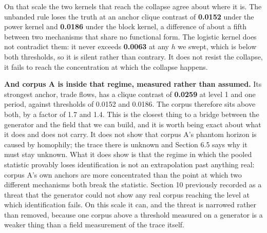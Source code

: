 \documentclass[twoside,11pt]{article}
\begin{document}
On that scale the two kernels that reach the collapse agree about where it is. The unbanded rule loses the truth at an anchor clique contrast of \textbf{0.0152} under the power kernel and \textbf{0.0186} under the block kernel, a difference of about a fifth between two mechanisms that share no functional form. The logistic kernel does not contradict them: it never exceeds \textbf{0.0063} at any \(h\) we swept, which is below both thresholds, so it is silent rather than contrary. It does not resist the collapse, it fails to reach the concentration at which the collapse happens.

\textbf{And corpus A is inside that regime, measured rather than assumed.} Its strongest anchor, trade flows, has a clique contrast of \textbf{0.0259} at level 1 and one period, against thresholds of 0.0152 and 0.0186. The corpus therefore sits above both, by a factor of 1.7 and 1.4. This is the closest thing to a bridge between the generator and the field that we can build, and it is worth being exact about what it does and does not carry. It does not show that corpus A's phantom horizon is caused by homophily; the trace there is unknown and Section 6.5 says why it must stay unknown. What it does show is that the regime in which the pooled statistic provably loses identification is not an extrapolation past anything real: corpus A's own anchors are more concentrated than the point at which two different mechanisms both break the statistic. Section 10 previously recorded as a threat that the generator could not show any real corpus reaching the level at which identification fails. On this scale it can, and the threat is narrowed rather than removed, because one corpus above a threshold measured on a generator is a weaker thing than a field measurement of the trace itself.
\end{document}
